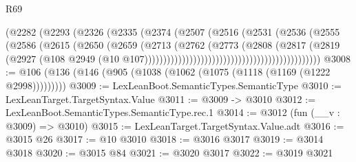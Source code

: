 \begin{lexlean}{R69}
\begin{coremodule}
                                                    (@2282
                                                      (@2293
                                                        (@2326
                                                          (@2335
                                                            (@2374
                                                              (@2507
                                                                (@2516
                                                                  (@2531
                                                                    (@2536
                                                                      (@2555
                                                                        (@2586
                                                                          (@2615
                                                                            (@2650
                                                                              (@2659
                                                                                (@2713
                                                                                  (@2762
                                                                                    (@2773
                                                                                      (@2808
                                                                                        (@2817
                                                                                          (@2819
                                                                                            (@2927
                                                                                              (@108
                                                                                                @2949
                                                                                                (@10
                                                                                                  @107)))))))))))))))))))))))))))))))))))))))))))))))
@3008 := @106 (@136 (@146 (@905 (@1038 (@1062 (@1075 (@1118 (@1169 (@1222 @2998)))))))))
@3009 := LexLeanBoot.SemanticTypes.SemanticType
@3010 := LexLeanTarget.TargetSyntax.Value
@3011 := @3009 -> @3010
@3012 := LexLeanBoot.SemanticTypes.SemanticType.rec.{1}
@3014 := @3012 (fun (__v : @3009) => @3010)
@3015 := LexLeanTarget.TargetSyntax.Value.adt
@3016 := @3015 @26
@3017 := @10 @3010
@3018 := @3016 @3017
@3019 := @3014 @3018
@3020 := @3015 @84
@3021 := @3020 @3017
@3022 := @3019 @3021

\end{coremodule}
\end{lexlean}
